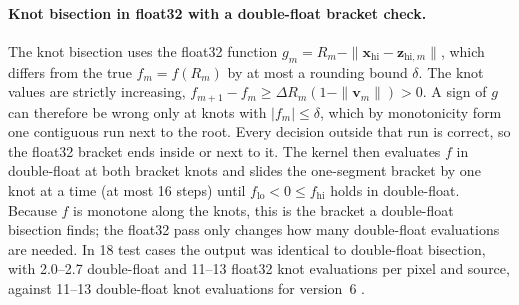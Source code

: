 \documentclass[11pt, a4paper]{article}
\begin{document}
\paragraph{Knot bisection in float32 with a double-float bracket check.} The knot bisection uses the float32 function $g_m = R_m - \|\mathbf{x}_{\text{hi}} - \mathbf{z}_{\text{hi},m}\|$, which differs from the true $f_m = f(R_m)$ by at most a rounding bound $\delta$. The knot values are strictly increasing, $f_{m+1} - f_m \ge \Delta R_m(1 - \|\mathbf{v}_m\|) > 0$. A sign of $g$ can therefore be wrong only at knots with $|f_m| \le \delta$, which by monotonicity form one contiguous run next to the root. Every decision outside that run is correct, so the float32 bracket ends inside or next to it. The kernel then evaluates $f$ in double-float at both bracket knots and slides the one-segment bracket by one knot at a time (at most 16 steps) until $f_{\text{lo}} < 0 \le f_{\text{hi}}$ holds in double-float. Because $f$ is monotone along the knots, this is the bracket a double-float bisection finds; the float32 pass only changes how many double-float evaluations are needed. In 18 test cases the output was identical to double-float bisection, with 2.0--2.7 double-float and 11--13 float32 knot evaluations per pixel and source, against 11--13 double-float knot evaluations for version~6 \cite{swarm2026}.
\end{document}
